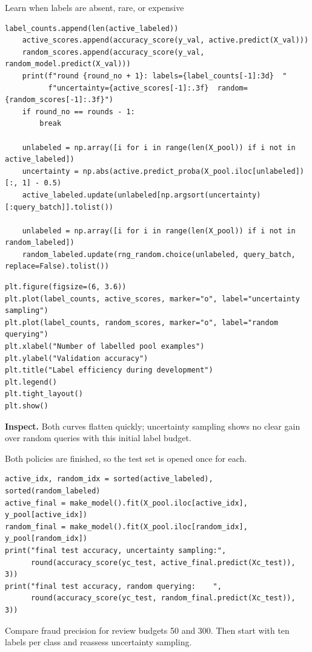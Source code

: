 \begin{labproject}{Learn when labels are absent, rare, or expensive}
\begin{lstlisting}[style=utppython]
    label_counts.append(len(active_labeled))
    active_scores.append(accuracy_score(y_val, active.predict(X_val)))
    random_scores.append(accuracy_score(y_val, random_model.predict(X_val)))
    print(f"round {round_no + 1}: labels={label_counts[-1]:3d}  "
          f"uncertainty={active_scores[-1]:.3f}  random={random_scores[-1]:.3f}")
    if round_no == rounds - 1:
        break

    unlabeled = np.array([i for i in range(len(X_pool)) if i not in active_labeled])
    uncertainty = np.abs(active.predict_proba(X_pool.iloc[unlabeled])[:, 1] - 0.5)
    active_labeled.update(unlabeled[np.argsort(uncertainty)[:query_batch]].tolist())

    unlabeled = np.array([i for i in range(len(X_pool)) if i not in random_labeled])
    random_labeled.update(rng_random.choice(unlabeled, query_batch, replace=False).tolist())
\end{lstlisting}

\begin{lstlisting}[style=utppython]
plt.figure(figsize=(6, 3.6))
plt.plot(label_counts, active_scores, marker="o", label="uncertainty sampling")
plt.plot(label_counts, random_scores, marker="o", label="random querying")
plt.xlabel("Number of labelled pool examples")
plt.ylabel("Validation accuracy")
plt.title("Label efficiency during development")
plt.legend()
plt.tight_layout()
plt.show()
\end{lstlisting}

\textbf{Inspect.} Both curves flatten quickly; uncertainty sampling shows no clear gain over random queries with this initial label budget.

Both policies are finished, so the test set is opened once for each.

\begin{lstlisting}[style=utppython]
active_idx, random_idx = sorted(active_labeled), sorted(random_labeled)
active_final = make_model().fit(X_pool.iloc[active_idx], y_pool[active_idx])
random_final = make_model().fit(X_pool.iloc[random_idx], y_pool[random_idx])
print("final test accuracy, uncertainty sampling:",
      round(accuracy_score(yc_test, active_final.predict(Xc_test)), 3))
print("final test accuracy, random querying:    ",
      round(accuracy_score(yc_test, random_final.predict(Xc_test)), 3))
\end{lstlisting}

\begin{tryit}
Compare fraud precision for review budgets 50 and 300. Then start with ten labels per class and reassess uncertainty sampling.
\end{tryit}
\end{labproject}

